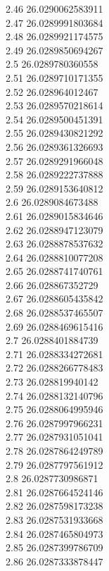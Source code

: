 {2.46	26.0290062583911\\
2.47	26.0289991803684\\
2.48	26.0289921174575\\
2.49	26.0289850694267\\
2.5	26.0289780360558\\
2.51	26.0289710171355\\
2.52	26.028964012467\\
2.53	26.0289570218614\\
2.54	26.0289500451391\\
2.55	26.0289430821292\\
2.56	26.0289361326693\\
2.57	26.0289291966048\\
2.58	26.0289222737888\\
2.59	26.0289153640812\\
2.6	26.0289084673488\\
2.61	26.0289015834646\\
2.62	26.0288947123079\\
2.63	26.0288878537632\\
2.64	26.0288810077208\\
2.65	26.0288741740761\\
2.66	26.028867352729\\
2.67	26.0288605435842\\
2.68	26.0288537465507\\
2.69	26.0288469615416\\
2.7	26.0288401884739\\
2.71	26.0288334272681\\
2.72	26.0288266778483\\
2.73	26.028819940142\\
2.74	26.0288132140796\\
2.75	26.0288064995946\\
2.76	26.0287997966231\\
2.77	26.0287931051041\\
2.78	26.0287864249789\\
2.79	26.0287797561912\\
2.8	26.0287730986871\\
2.81	26.0287664524146\\
2.82	26.0287598173238\\
2.83	26.0287531933668\\
2.84	26.0287465804973\\
2.85	26.0287399786709\\
2.86	26.0287333878447\\
}
